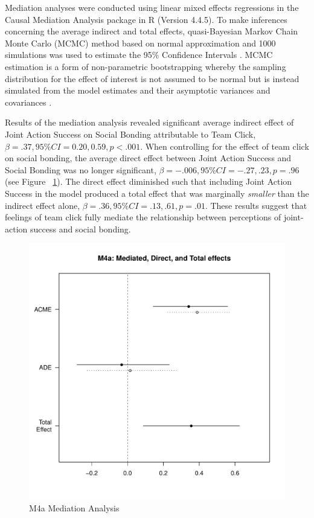   Mediation analyses were conducted using linear mixed effects regressions in the Causal Mediation Analysis package in R (Version 4.4.5).  To make inferences concerning the average indirect and total effects, quasi-Bayesian Markov Chain Monte Carlo (MCMC) method based on normal approximation and 1000 simulations was used to estimate the 95\% Confidence Intervals \citep{Tofighi2016a,Imai2010}. MCMC estimation is a form of non-parametric bootstrapping whereby the sampling distribution for the effect of interest is not assumed to be normal but is instead simulated from the model estimates and their asymptotic variances and covariances \cite{Preacher2008}.

  Results of the mediation analysis revealed significant average indirect effect of Joint Action Success on Social Bonding attributable to Team Click, $\beta = .37, 95\% CI = 0.20 , 0.59, p < .001$.  When controlling for the effect of team click on social bonding, the average direct effect between Joint Action Success and Social Bonding was no longer significant, $\beta = -.006, 95\% CI = -.27 , .23, p = .96 $ (see Figure ~\ref{fig:MLM4aMediationAnalysis}). The direct effect diminished such that including Joint Action Success in the model produced a total effect that was marginally \textit{smaller} than the indirect effect alone, $\beta = .36, 95\% CI = .13 , .61, p = .01$. These results suggest that feelings of team click fully mediate the relationship between perceptions of joint-action success and social bonding.



  \begin{figure}[htbp]
    \centering
    \includegraphics[scale = .5]{images/MLM4aMediationEffects.pdf}
    \caption{M4a Mediation Analysis}
    \label{fig:MLM4aMediationAnalysis}
  \end{figure}


